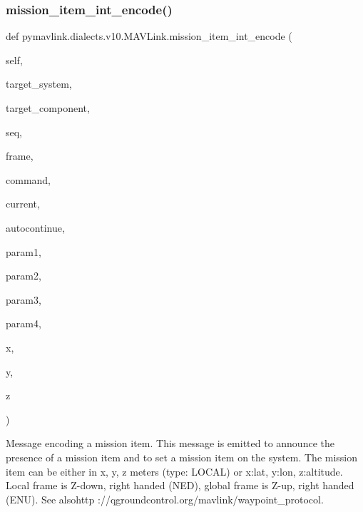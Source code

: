 \begin{DoxyVerb}
\begin{DoxyVerb}
\begin{DoxyVerb}
\begin{DoxyVerb}
\subsubsection{\texorpdfstring{mission\+\_\+item\+\_\+int\+\_\+encode()}{mission\_item\_int\_encode()}}
{\footnotesize\ttfamily def pymavlink.\+dialects.\+v10.\+M\+A\+V\+Link.\+mission\+\_\+item\+\_\+int\+\_\+encode (\begin{DoxyParamCaption}\item[{}]{self,  }\item[{}]{target\+\_\+system,  }\item[{}]{target\+\_\+component,  }\item[{}]{seq,  }\item[{}]{frame,  }\item[{}]{command,  }\item[{}]{current,  }\item[{}]{autocontinue,  }\item[{}]{param1,  }\item[{}]{param2,  }\item[{}]{param3,  }\item[{}]{param4,  }\item[{}]{x,  }\item[{}]{y,  }\item[{}]{z }\end{DoxyParamCaption})}

\begin{DoxyVerb}Message encoding a mission item. This message is emitted to announce
the presence of a mission item and to set a mission
item on the system. The mission item can be either in
x, y, z meters (type: LOCAL) or x:lat, y:lon,
z:altitude. Local frame is Z-down, right handed (NED),
global frame is Z-up, right handed (ENU). See alsohttp
://qgroundcontrol.org/mavlink/waypoint_protocol.


\end{DoxyVerb}
\end{DoxyVerb}
\end{DoxyVerb}
\end{DoxyVerb}
\end{DoxyVerb}
